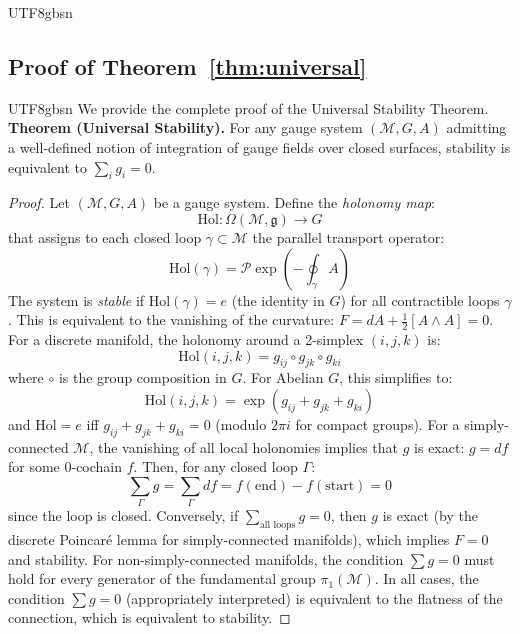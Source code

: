 \documentclass[11pt,a4paper]{article}
\newcommand{\Manifold}{\mathcal{M}}
\begin{document}
\begin{CJK}{UTF8}{gbsn}
{\subsection{Proof of Theorem~\ref{thm:universal}}
\begin{CJK}{UTF8}{gbsn}
We provide the complete proof of the Universal Stability Theorem.
\textbf{Theorem (Universal Stability).} For any gauge system $(\Manifold, G, A)$
admitting a well-defined notion of integration of gauge fields over closed
surfaces, stability is equivalent to $\sum_i g_i = 0$.
\begin{proof}
Let $(\Manifold, G, A)$ be a gauge system. Define the \textit{holonomy map}:
\begin{equation}
    \mathrm{Hol}: \Omega(\Manifold, \mathfrak{g}) \to G
\end{equation}
that assigns to each closed loop $\gamma \subset \Manifold$ the parallel transport
operator:
\begin{equation}
    \mathrm{Hol}(\gamma) = \mathcal{P} \exp\left(-\oint_\gamma A\right)
\end{equation}
The system is \textit{stable} if $\mathrm{Hol}(\gamma) = e$ (the identity in $G$)
for all contractible loops $\gamma$. This is equivalent to the vanishing of the
curvature: $F = dA + \frac{1}{2}[A \wedge A] = 0$.
For a discrete manifold, the holonomy around a 2-simplex $(i,j,k)$ is:
\begin{equation}
    \mathrm{Hol}(i,j,k) = g_{ij} \circ g_{jk} \circ g_{ki}
\end{equation}
where $\circ$ is the group composition in $G$. For Abelian $G$, this simplifies to:
\begin{equation}
    \mathrm{Hol}(i,j,k) = \exp(g_{ij} + g_{jk} + g_{ki})
\end{equation}
and $\mathrm{Hol} = e$ iff $g_{ij} + g_{jk} + g_{ki} = 0$ (modulo $2\pi i$ for
compact groups).
For a simply-connected $\Manifold$, the vanishing of all local holonomies implies
that $g$ is exact: $g = df$ for some 0-cochain $f$. Then, for any closed loop
$\Gamma$:
\begin{equation}
    \sum_{\Gamma} g = \sum_{\Gamma} df = f(\text{end}) - f(\text{start}) = 0
\end{equation}
since the loop is closed. Conversely, if $\sum_{\text{all loops}} g = 0$, then
$g$ is exact (by the discrete Poincaré lemma for simply-connected manifolds),
which implies $F = 0$ and stability.
For non-simply-connected manifolds, the condition $\sum g = 0$ must hold for
every generator of the fundamental group $\pi_1(\Manifold)$.
In all cases, the condition $\sum g = 0$ (appropriately interpreted) is equivalent
to the flatness of the connection, which is equivalent to stability.
\end{proof}

\end{CJK}}
\end{CJK}
\end{document}
